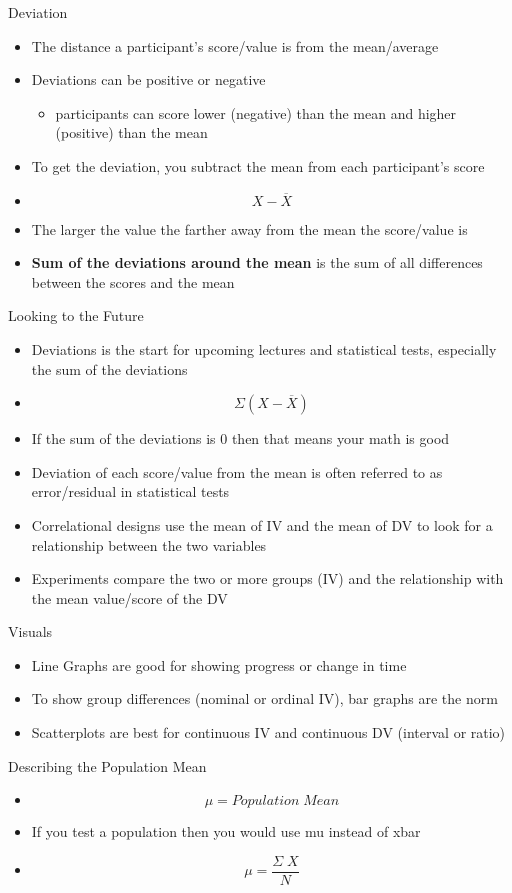 \documentclass[
  ignorenonframetext,
]{beamer}
\providecommand{\tightlist}{%
  \setlength{\itemsep}{0pt}\setlength{\parskip}{0pt}}\usepackage{longtable,booktabs,array}
\begin{document}
\begin{frame}{Deviation}
\label{deviation}
\begin{itemize}
\item
  The distance a participant's score/value is from the mean/average
\item
  Deviations can be positive or negative

  \begin{itemize}
  \tightlist
  \item
    participants can score lower (negative) than the mean and higher
    (positive) than the mean
  \end{itemize}
\item
  To get the deviation, you subtract the mean from each participant's
  score
\item
  \[ X - \overline{X} \]
\item
  The larger the value the farther away from the mean the score/value is
\item
  \textbf{Sum of the deviations around the mean} is the sum of all
  differences between the scores and the mean
\end{itemize}
\end{frame}

\begin{frame}{Looking to the Future}
\label{looking-to-the-future}
\begin{itemize}
\item
  Deviations is the start for upcoming lectures and statistical tests,
  especially the sum of the deviations
\item
  \[ \Sigma(X - \overline{X}) \]
\item
  If the sum of the deviations is 0 then that means your math is good
\item
  Deviation of each score/value from the mean is often referred to as
  error/residual in statistical tests
\item
  Correlational designs use the mean of IV and the mean of DV to look
  for a relationship between the two variables
\item
  Experiments compare the two or more groups (IV) and the relationship
  with the mean value/score of the DV
\end{itemize}
\end{frame}

\begin{frame}{Visuals}
\label{visuals}
\begin{itemize}
\item
  Line Graphs are good for showing progress or change in time
\item
  To show group differences (nominal or ordinal IV), bar graphs are the
  norm
\item
  Scatterplots are best for continuous IV and continuous DV (interval or
  ratio)
\end{itemize}
\end{frame}

\begin{frame}{Describing the Population Mean}
\label{describing-the-population-mean}
\begin{itemize}
\item
  \[ \mu = Population\;Mean \]
\item
  If you test a population then you would use mu instead of xbar
\item
  \[ \mu = \frac{\Sigma\;X}{N} \]
\end{itemize}
\end{frame}
\end{document}
